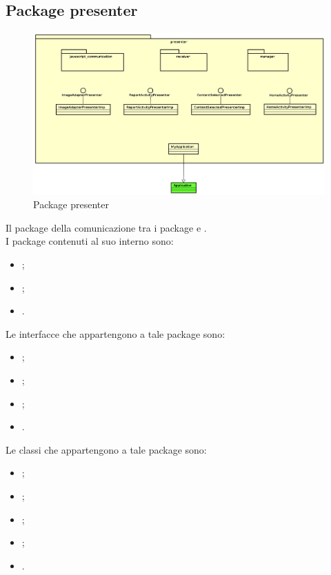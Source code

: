 \documentclass[../Tesi.tex]{subfiles}
\begin{document}
	\subsection{Package presenter}
		\begin{figure}[H]
			\centering
			\includegraphics[scale=0.4]{images/package_diagrams/presenter}
				\caption{Package presenter}
		\end{figure}
		Il package  della comunicazione tra i package  e . \\
		I package contenuti al suo interno sono:
		\begin{itemize}
			\item {};
			\item {};
			\item {}.
		\end{itemize}
		Le interfacce che appartengono a tale package sono:
		\begin{itemize}
			\item {};
			\item {};
			\item {};
			\item {}.
		\end{itemize}
		Le classi che appartengono a tale package sono:
		\begin{itemize}
			\item {};
			\item {};
			\item {};
			\item {};
			\item {}.
		\end{itemize}
\end{document}
